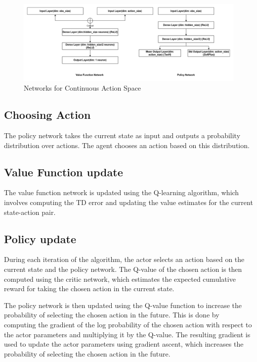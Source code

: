 \documentclass{article} %
\begin{document}
\begin{figure}[H]
    \begin{center}
        \includegraphics[width=\textwidth]{continuous.png}
    \end{center}
    \caption{Networks for Continuous Action Space}
\end{figure}

\subsection{Choosing Action}
The policy network takes the current state as input and outputs a probability distribution over actions. The agent chooses an action based on this distribution. 

\subsection{Value Function update}
The value function network is updated using the Q-learning algorithm, which involves computing the TD error and updating the value estimates for the current state-action pair.

\subsection{Policy update}
During each iteration of the algorithm, the actor selects an action based on the current state and the policy network. The Q-value of the chosen action is then computed using the critic network, which estimates the expected cumulative reward for taking the chosen action in the current state.

The policy network is then updated using the Q-value function to increase the probability of selecting the chosen action in the future. This is done by computing the gradient of the log probability of the chosen action with respect to the actor parameters and multiplying it by the Q-value. The resulting gradient is used to update the actor parameters using gradient ascent, which increases the probability of selecting the chosen action in the future.
\end{document}
